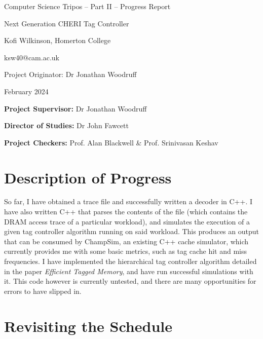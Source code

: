 \documentclass[10pt,a4paper]{article}
\begin{document}
{\centering \Large Computer Science Tripos -- Part II -- Progress Report\par}
\vspace{1cm}
{\centering \Huge Next Generation CHERI Tag Controller\par}
\vspace{1.5cm}
{\centering \large Kofi Wilkinson, Homerton College\par}
{\centering \large ksw40@cam.ac.uk\par}
{\centering \large Project Originator: Dr Jonathan Woodruff\par}
{\centering \large {} February 2024\par}
\vspace{1.5cm}


\textbf{Project Supervisor:} Dr Jonathan Woodruff\par
\textbf{Director of Studies:} Dr John Fawcett\par
\textbf{Project Checkers:} Prof. Alan Blackwell \& Prof. Srinivasan Keshav
\vspace{2cm}


\section*{Description of Progress}
So far, I have obtained a trace file and successfully written a decoder in C++. I have also written C++ that parses the contents of the
file (which contains the DRAM access trace of a particular workload), and simulates
the execution of a given tag controller algorithm running on said workload. This
produces an output that can be consumed by ChampSim, an existing C++ cache
simulator, which currently provides me with some basic metrics, such as tag cache hit and miss frequencies.
I have implemented the hierarchical tag controller algorithm detailed in the
paper \textit{Efficient Tagged Memory}, and have run successful simulations with
it. This code however is currently untested, and there are many opportunities for errors
to have slipped in.

\section*{Revisiting the Schedule}
\end{document}
